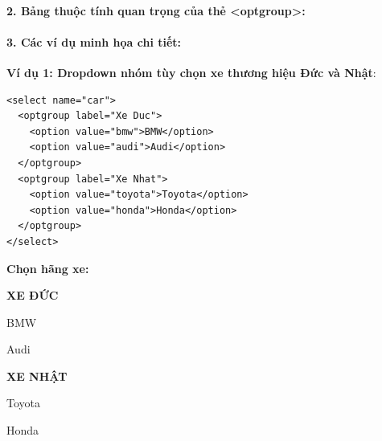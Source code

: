 \documentclass[11pt,oneside]{book}
\newcommand{\thd}[1]{\textcolor{white}{\textbf{\strut #1}}}
\newcommand{\codeinline}[1]{\textcolor{accentOrange}{\texttt{#1}}}
\begin{document}
\paragraph{2. Bảng thuộc tính quan trọng của thẻ <optgroup>:}

\begin{prettyTableBox}
\end{prettyTableBox}

\paragraph{3. Các ví dụ minh họa chi tiết:}

\textbf{Ví dụ 1: Dropdown nhóm tùy chọn xe thương hiệu Đức và Nhật}:
\begin{codeWindow}
\begin{lstlisting}[language=HTML5]
<select name="car">
  <optgroup label="Xe Duc">
    <option value="bmw">BMW</option>
    <option value="audi">Audi</option>
  </optgroup>
  <optgroup label="Xe Nhat">
    <option value="toyota">Toyota</option>
    <option value="honda">Honda</option>
  </optgroup>
</select>
\end{lstlisting}
\end{codeWindow}

\begin{browserWindow}
\sffamily\small
\textbf{Chọn hãng xe:} \par\vspace{4pt}
\begin{tcolorbox}[arc=2pt, colback=white, colframe=primaryBlue!50, boxsep=4pt, width=0.6\linewidth]
  \small
  \textbf{\textcolor{gray!80}{XE ĐỨC}} \par\vspace{2pt}
  \quad BMW \par\vspace{2pt}
  \quad Audi \par\vspace{3pt}
  \textbf{\textcolor{gray!80}{XE NHẬT}} \par\vspace{2pt}
  \quad Toyota \par\vspace{2pt}
  \quad Honda
\end{tcolorbox}
\end{browserWindow}
\end{document}
